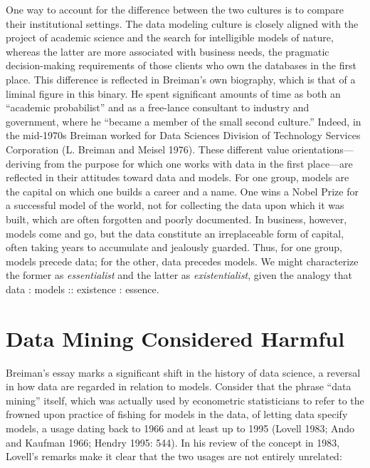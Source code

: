 \documentclass[
  letterpaper,
]{report}
\begin{document}
One way to account for the difference between the two cultures is to
compare their institutional settings. The data modeling culture is
closely aligned with the project of academic science and the search for
intelligible models of nature, whereas the latter are more associated
with business needs, the pragmatic decision-making requirements of those
clients who own the databases in the first place. This difference is
reflected in Breiman's own biography, which is that of a liminal figure
in this binary. He spent significant amounts of time as both an
``academic probabilist'' and as a free-lance consultant to industry and
government, where he ``became a member of the small second culture.''
Indeed, in the mid-1970s Breiman worked for Data Sciences Division of
Technology Services Corporation (L. Breiman and Meisel 1976). These
different value orientations---deriving from the purpose for which one
works with data in the first place---are reflected in their attitudes
toward data and models. For one group, models are the capital on which
one builds a career and a name. One wins a Nobel Prize for a successful
model of the world, not for collecting the data upon which it was built,
which are often forgotten and poorly documented. In business, however,
models come and go, but the data constitute an irreplaceable form of
capital, often taking years to accumulate and jealously guarded. Thus,
for one group, models precede data; for the other, data precedes models.
We might characterize the former as \emph{essentialist} and the latter
as \emph{existentialist}, given the analogy that data : models ::
existence : essence.

\hypertarget{data-mining-considered-harmful}{%
\section{Data Mining Considered
Harmful}\label{data-mining-considered-harmful}}

Breiman's essay marks a significant shift in the history of data
science, a reversal in how data are regarded in relation to models.
Consider that the phrase ``data mining'' itself, which was actually used
by econometric statisticians to refer to the frowned upon practice of
fishing for models in the data, of letting data specify models, a usage
dating back to 1966 and at least up to 1995 (Lovell 1983; Ando and
Kaufman 1966; Hendry 1995: 544). In his review of the concept in 1983,
Lovell's remarks make it clear that the two usages are not entirely
unrelated:
\end{document}
